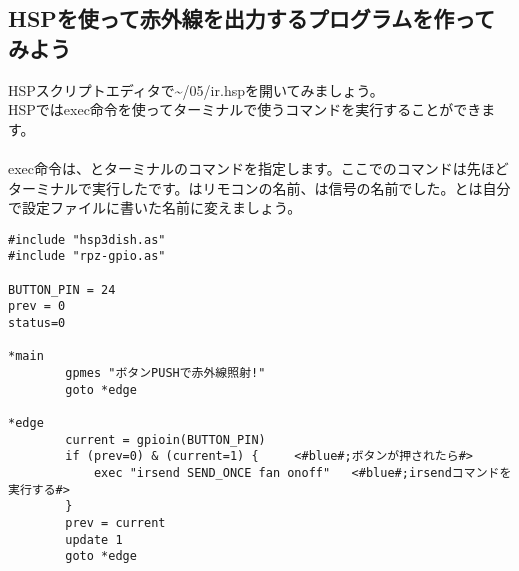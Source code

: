 \subsection{HSPを使って赤外線を出力するプログラムを作ってみよう}
HSPスクリプトエディタで\textasciitilde /05/ir.hspを開いてみましょう。\\
HSPではexec命令を使ってターミナルで使うコマンドを実行することができます。\\
\\
exec命令は、とターミナルのコマンドを指定します。ここでのコマンドは先ほどターミナルで実行したです。\code{\textcolor{red}{fan}}はリモコンの名前、\code{\textcolor{red}{onoff}}は信号の名前でした。\code{\textcolor{red}{fan}}と\code{\textcolor{red}{onoff}}は自分で設定ファイルに書いた名前に変えましょう。\\

\begin{lstlisting}[caption=ir.hsp,label=ir.hsp]
#include "hsp3dish.as"
#include "rpz-gpio.as"

BUTTON_PIN = 24
prev = 0
status=0

*main
        gpmes "ボタンPUSHで赤外線照射!"
        goto *edge

*edge
        current = gpioin(BUTTON_PIN)
        if (prev=0) & (current=1) {		<#blue#;ボタンが押されたら#>
            exec "irsend SEND_ONCE fan onoff"	<#blue#;irsendコマンドを実行する#>
        }
        prev = current
        update 1
        goto *edge
\end{lstlisting}

\begin{tcolorbox}[title=\useOmetoi]
\begin{enumerate}
\end{enumerate}
\end{tcolorbox}